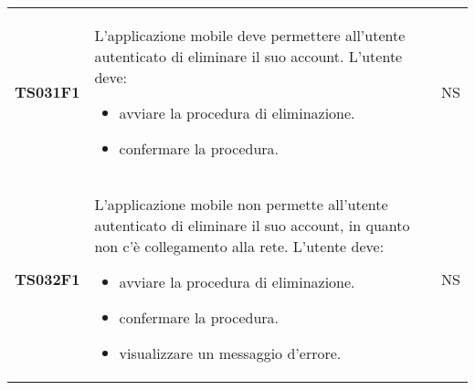 \documentclass[../piano-di-qualifica.tex]{subfiles}
\begin{document}
\begin{centering}
\begin{longtable}[H]{>{\centering\bfseries}m{3cm} >{}p{10cm} >{\centering\arraybackslash}m{3cm}}
    TS031F1            & L'applicazione mobile deve permettere all'utente autenticato di eliminare il suo account. \newline
    L'utente deve:
    \begin{itemize}
      \item avviare la procedura di eliminazione.
      \item confermare la procedura.
    \end{itemize}
                       & NS                                                                                                                                                                                                                                                               \\
    TS032F1            & L'applicazione mobile non permette all'utente autenticato di eliminare il suo account, in quanto non c'è collegamento alla rete. \newline
    L'utente deve:
    \begin{itemize}
      \item avviare la procedura di eliminazione.
      \item confermare la procedura.
      \item visualizzare un messaggio d'errore.
    \end{itemize}
                       & NS                                                                                                                                                                                                                                                               \\



\end{longtable}
\end{centering}
\end{document}
